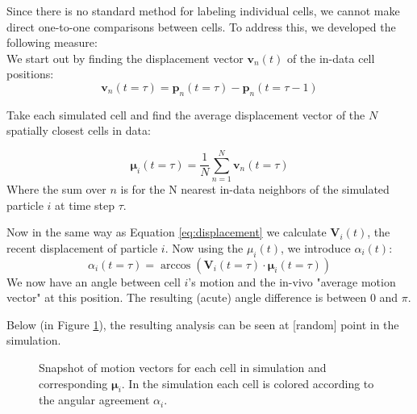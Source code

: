 Since there is no standard method for labeling individual cells, we cannot make direct one-to-one comparisons between cells. To address this, we developed the following measure:\\

We start out by finding the displacement vector $\boldsymbol{v}_n(t)$ of the in-data cell positions:
\begin{equation}
\label{eq:displacement}
\boldsymbol{v}_n(t=\tau) =\boldsymbol{p}_n(t=\tau) - \boldsymbol{p}_n(t=\tau-1)
\end{equation}


Take each simulated cell and find the average displacement vector of the $N$ spatially closest cells in data:

\begin{equation}
    \boldsymbol{\mu}_i(t=\tau) = \frac{1}{N} \sum_{n=1}^{N}\boldsymbol{v}_n(t=\tau)
\end{equation}
Where the sum over $n$ is for the N nearest in-data neighbors of the simulated particle $i$ at time step $\tau$.

Now in the same way as Equation \ref{eq:displacement} we calculate $\boldsymbol{V}_i(t)$, the recent displacement of particle $i$. Now using the $\mu_i(t)$, we introduce $\alpha_i(t)$:
\begin{equation}
    \alpha_i(t=\tau) = \arccos\left(\boldsymbol{V}_i(t=\tau)\cdot\boldsymbol{\mu}_i(t=\tau)\right)
\end{equation}
We now have an angle between cell $i$'s motion and the in-vivo "average motion vector" at this position.
The resulting (acute) angle difference is between 0 and $\pi$. 

Below (in Figure  \ref{fig:motionAgreementExample}), the resulting analysis can be seen at [random] point in the simulation. 

\begin{figure}[H]
    \centering
    \caption{Snapshot of motion vectors for each cell in simulation and corresponding $\boldsymbol{\mu}_i$. In the simulation each cell is colored according to the angular agreement $\alpha_i$.}
    \label{fig:motionAgreementExample}
\end{figure}


